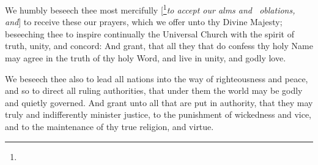 We humbly beseech thee most mercifully [\footnote{}\emph{to accept our alms and \grealtcross\ oblations, and}] to receive these our prayers, which we offer unto thy Divine Majesty; beseeching thee to inspire continually the Universal Church with the spirit of truth, unity, and concord: And grant, that all they that do confess thy holy Name may agree in the truth of thy holy Word, and live in unity, and godly love.






We beseech thee also to lead all nations into the way of righteousness and peace, and so to direct all 
ruling authorities,
that under them the world may be godly and quietly governed. 
And grant unto all that are put in authority,
that they may truly and indifferently minister justice, to the punishment of wickedness and vice, and to the maintenance of thy true religion, and virtue.

